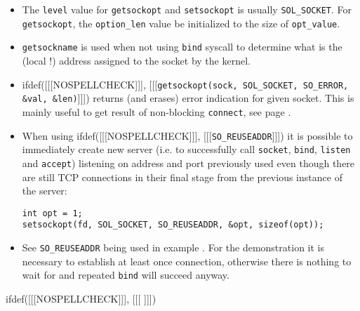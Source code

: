 \begin{itemize}
\item The \texttt{level} value for \texttt{getsockopt} and \texttt{setsockopt}
is usually \verb#SOL_SOCKET#. For \texttt{get\-sock\-opt},
the \texttt{option\_len} value  be initialized to
the size of \texttt{opt\_value}.
\item \texttt{getsockname} is used when not using \texttt{bind} syscall
to determine what is the (local !) address assigned to the socket by the kernel.
\item ifdef([[[NOSPELLCHECK]]],
[[[\verb#getsockopt(sock, SOL_SOCKET, SO_ERROR, &val, &len)#]]]) returns
(and erases) error indication for given socket. This is mainly useful to
get result of non-blocking \texttt{connect}, see page \pageref{CONNECT}.
\item When using ifdef([[[NOSPELLCHECK]]], [[[\verb#SO_REUSEADDR#]]]) it is
possible to immediately create new server (i.e. to successfully call
\texttt{socket},
\texttt{bind}, \texttt{listen} and \texttt{accept}) listening on address and
port previously used even though there are still TCP connections in their final
stage from the previous instance of the server:

\begin{verbatim}
int opt = 1;
setsockopt(fd, SOL_SOCKET, SO_REUSEADDR, &opt, sizeof(opt));
\end{verbatim}

\item See \verb#SO_REUSEADDR# being used in example .
For the demonstration it is necessary to establish at least once connection,
otherwise there is nothing to wait for and repeated \texttt{bind} will succeed
anyway.
\end{itemize}


ifdef([[[NOSPELLCHECK]]], [[[
]]])

